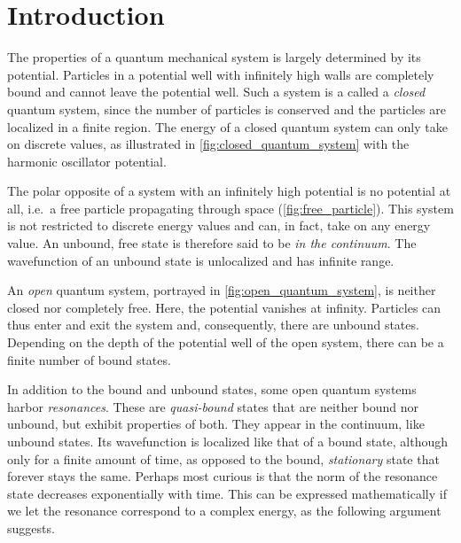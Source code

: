 \documentclass[../main/report.tex]{subfiles}
\begin{document}
\chapter{Introduction}

The properties of a quantum mechanical system is largely determined by its potential. 
Particles in a potential well with infinitely high walls are completely bound and cannot leave the potential well.
Such a system is a called a \emph{closed} quantum system, since the number of particles is conserved and the particles are localized in a finite region. 
The energy of a closed quantum system can only take on discrete values, as illustrated in \cref{fig:closed_quantum_system} with the harmonic oscillator potential.

The polar opposite of a system with an infinitely high potential is no potential at all, i.e.~a free particle propagating through space (\cref{fig:free_particle}).
This system is not restricted to discrete energy values and can, in fact, take on any energy value.
An unbound, free state is therefore said to be \emph{in the continuum}.
The wavefunction of an unbound state is unlocalized and has infinite range.

An \emph{open} quantum system, portrayed in \cref{fig:open_quantum_system}, is neither closed nor completely free.
Here, the potential vanishes at infinity.
Particles can thus enter and exit the system and, consequently, there are unbound states.
Depending on the depth of the potential well of the open system, there can be a finite number of bound states.

In addition to the bound and unbound states, some open quantum systems harbor \emph{resonances}. 
These are \emph{quasi-bound} states that are neither bound nor unbound, but exhibit properties of both. 
They appear in the continuum, like unbound states.
Its wavefunction is localized like that of a bound state, although only for a finite amount of time, as opposed to the bound, \emph{stationary} state that forever stays the same.
Perhaps most curious is that the norm of the resonance state decreases exponentially with time.
This can be expressed mathematically if we let the resonance correspond to a complex energy, as the following argument suggests.
\end{document}
